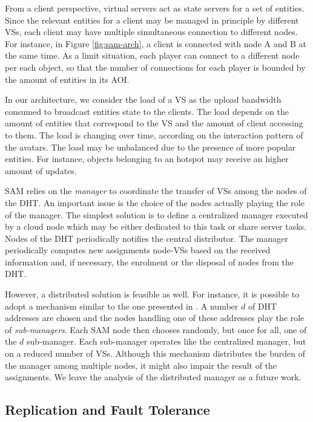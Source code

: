 \documentclass[final,10pt,a5paper]{phdimt}
\theoremstyle{definition}
\begin{document}
From a client perspective, virtual servers act as state servers for a set of entities.
Since the relevant entities for a client may be managed in principle by different VSs, each client may have multiple simultaneous connection to different nodes. 
For instance, in Figure \ref{fig:sam-arch}, a client is connected with node A and B at the same time. As a limit situation, each player can connect to a different node per each object, so that the number of connections for each player is bounded by the amount of entities in its AOI.

In our architecture, we consider the load of a VS as the upload bandwidth consumed to broadcast entities state to the clients.
The load depends on the amount of entities that correspond to the VS and the amount of client accessing to them.
The load is changing over time, according on the interaction pattern of the avatars.
The load may be unbalanced due to the presence of more popular entities.
For instance, objects belonging to an hotspot may receive an higher amount of updates. 


SAM relies on the \textit{manager} to coordinate the transfer of VSs among the
nodes of the DHT. An important issue is the choice of the nodes actually playing the role of the manager. The simplest
solution is to define a centralized manager executed by a cloud node which may be
either dedicated to this task or share server tasks. 
Nodes of the DHT periodically notifies the central distributor.
The manager periodically computes new assignments node-VSs based on the received information and, if necessary, the enrolment or the disposal of nodes from the DHT.


However, a distributed solution is feasible as well. For instance, it is possible to adopt  
a mechanism similar to the one presented in \cite{Rao2003}. A number $d$ of DHT addresses are chosen  and the nodes handling one of these addresses play the role of \textit{sub-managers}. Each SAM node then chooses randomly, but once for all, one of the $d$ sub-manager. Each sub-manager operates like the centralized manager, but on a reduced number of VSs. Although this mechanism distributes the burden of the manager among multiple nodes, it might also impair the result of the assignments. We leave the analysis of the distributed manager  as a future work.
 




\subsection{Replication and Fault Tolerance}
\label{replication}
\end{document}
